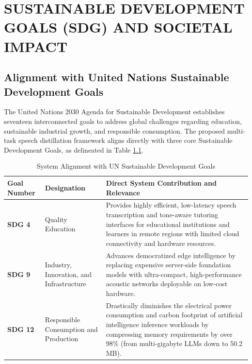 \chapter{SUSTAINABLE DEVELOPMENT GOALS (SDG) AND SOCIETAL IMPACT}
\label{app:sdg_impact}

\section{Alignment with United Nations Sustainable Development Goals}
The United Nations 2030 Agenda for Sustainable Development establishes seventeen interconnected goals to address global challenges regarding education, sustainable industrial growth, and responsible consumption. The proposed multi-task speech distillation framework aligns directly with three core Sustainable Development Goals, as delineated in Table \ref{tab:sdg_alignment}.

\begin{table}[htbp]
\centering
\caption{System Alignment with UN Sustainable Development Goals}
\label{tab:sdg_alignment}
\begin{tabular}{lp{4.2cm}p{7.5cm}}
\toprule
\textbf{Goal Number} & \textbf{Designation} & \textbf{Direct System Contribution and Relevance} \\
\midrule
\textbf{SDG 4} & Quality Education & Provides highly efficient, low-latency speech transcription and tone-aware tutoring interfaces for educational institutions and learners in remote regions with limited cloud connectivity and hardware resources. \\
\addlinespace
\textbf{SDG 9} & Industry, Innovation, and Infrastructure & Advances democratized edge intelligence by replacing expensive server-side foundation models with ultra-compact, high-performance acoustic networks deployable on low-cost hardware. \\
\addlinespace
\textbf{SDG 12} & Responsible Consumption and Production & Drastically diminishes the electrical power consumption and carbon footprint of artificial intelligence inference workloads by compressing memory requirements by over 98\% (from multi-gigabyte LLMs down to 50.2 MB). \\
\bottomrule
\end{tabular}
\end{table}

